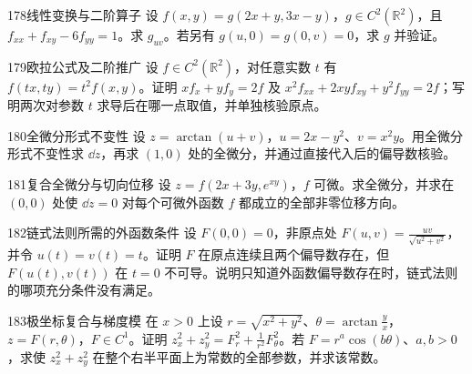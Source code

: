 \begin{exercise}{178}{线性变换与二阶算子}
设 $f(x,y)=g(2x+y,3x-y)$，$g\in C^2(\mathbb R^2)$，且 $f_{xx}+f_{xy}-6f_{yy}=1$。求 $g_{uv}$。若另有 $g(u,0)=g(0,v)=0$，求 $g$ 并验证。
\end{exercise}
\begin{exercise}{179}{欧拉公式及二阶推广}
设 $f\in C^2(\mathbb R^2)$，对任意实数 $t$ 有 $f(tx,ty)=t^2f(x,y)$。证明 $xf_x+yf_y=2f$ 及 $x^2f_{xx}+2xyf_{xy}+y^2f_{yy}=2f$；写明两次对参数 $t$ 求导后在哪一点取值，并单独核验原点。
\end{exercise}
\begin{exercise}{180}{全微分形式不变性}
设 $z=\arctan(u+v)$，$u=2x-y^2$、$v=x^2y$。用全微分形式不变性求 $\dd z$，再求 $(1,0)$ 处的全微分，并通过直接代入后的偏导数核验。
\end{exercise}
\begin{exercise}{181}{复合全微分与切向位移}
设 $z=f(2x+3y,e^{xy})$，$f$ 可微。求全微分，并求在 $(0,0)$ 处使 $\dd z=0$ 对每个可微外函数 $f$ 都成立的全部非零位移方向。
\end{exercise}
\begin{exercise}{182}{链式法则所需的外函数条件}
设 $F(0,0)=0$，非原点处 $F(u,v)=\frac{uv}{\sqrt{u^2+v^2}}$，并令 $u(t)=v(t)=t$。证明 $F$ 在原点连续且两个偏导数存在，但 $F(u(t),v(t))$ 在 $t=0$ 不可导。说明只知道外函数偏导数存在时，链式法则的哪项充分条件没有满足。
\end{exercise}
\begin{exercise}{183}{极坐标复合与梯度模}
在 $x>0$ 上设 $r=\sqrt{x^2+y^2}$、$\theta=\arctan\frac yx$，$z=F(r,\theta)$，$F\in C^1$。证明 $z_x^2+z_y^2=F_r^2+\frac1{r^2}F_\theta^2$。若 $F=r^a\cos(b\theta)$、$a,b>0$，求使 $z_x^2+z_y^2$ 在整个右半平面上为常数的全部参数，并求该常数。
\end{exercise}

